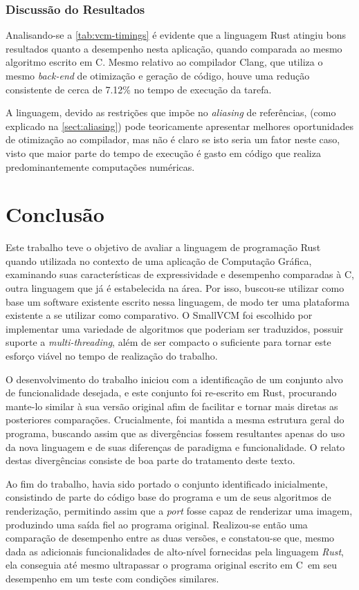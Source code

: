 \documentclass[tg]{mdtufsm}
\def\Cpp{{C\nolinebreak[4]\raisebox{.20ex}{\small\bf++}}}
\begin{document}
\subsection{Discussão do Resultados}

Analisando-se a \autoref{tab:vcm-timings} é evidente que a linguagem Rust atingiu bons resultados quanto a desempenho nesta aplicação, quando comparada ao mesmo algoritmo escrito em \Cpp. Mesmo relativo ao compilador Clang, que utiliza o mesmo \emph{back-end} de otimização e geração de código, houve uma redução consistente de cerca de 7.12\% no tempo de execução da tarefa.

A linguagem, devido as restrições que impõe no \emph{aliasing} de referências, (como explicado na \autoref{sect:aliasing}) pode teoricamente apresentar melhores oportunidades de otimização ao compilador, mas não é claro se isto seria um fator neste caso, visto que maior parte do tempo de execução é gasto em código que realiza  predominantemente computações numéricas.

\chapter{Conclusão}

Este trabalho teve o objetivo de avaliar a linguagem de programação Rust quando utilizada no contexto de uma aplicação de Computação Gráfica, examinando suas características de expressividade e desempenho comparadas à \Cpp, outra linguagem que já é estabelecida na área. Por isso, buscou-se utilizar como base um software existente escrito nessa linguagem, de modo ter uma plataforma existente a se utilizar como comparativo. O SmallVCM foi escolhido por implementar uma variedade de algoritmos que poderiam ser traduzidos, possuir suporte a \emph{multi-threading}, além de ser compacto o suficiente para tornar este esforço viável no tempo de realização do trabalho.

O desenvolvimento do trabalho iniciou com a identificação de um conjunto alvo de funcionalidade desejada, e este conjunto foi re-escrito em Rust, procurando mante-lo similar à sua versão original afim de facilitar e tornar mais diretas as posteriores comparações. Crucialmente, foi mantida a mesma estrutura geral do programa, buscando assim que as divergências fossem resultantes apenas do uso da nova linguagem e de suas diferenças de paradigma e funcionalidade. O relato destas divergências consiste de boa parte do tratamento deste texto.

Ao fim do trabalho, havia sido portado o conjunto identificado inicialmente, consistindo de parte do código base do programa e um de seus algoritmos de renderização, permitindo assim que a \emph{port} fosse capaz de renderizar uma imagem, produzindo uma saída fiel ao programa original. Realizou-se então uma comparação de desempenho entre as duas versões, e constatou-se que, mesmo dada as adicionais funcionalidades de alto-nível fornecidas pela linguagem \emph{Rust}, ela conseguia até mesmo ultrapassar o programa original escrito em \Cpp\ em seu desempenho em um teste com condições similares.
\end{document}
